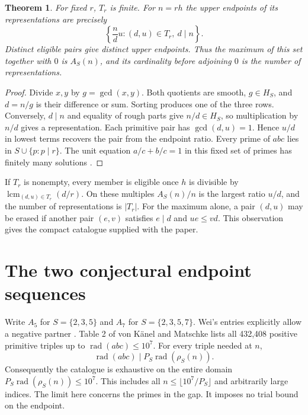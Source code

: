 \documentclass[11pt,letterpaper]{article}
\newtheorem{theorem}{Theorem}
\newcommand{\Hs}{H_S}
\newcommand{\rad}{\operatorname{rad}}
\newcommand{\rough}{\rho_S}
\newcommand{\lcm}{\operatorname{lcm}}
\begin{document}
\begin{theorem}\label{th:templates}
For fixed $r$, $T_r$ is finite. For $n=rh$ the upper endpoints of its representations are precisely
\[
 \left\{\frac{n}{d}u:(d,u)\in T_r,\ d\mid n\right\}.
\]
Distinct eligible pairs give distinct upper endpoints. Thus the maximum of this set together with $0$ is $A_S(n)$, and its cardinality before adjoining $0$ is the number of representations.
\end{theorem}
\begin{proof}
Divide $x,y$ by $g=\gcd(x,y)$. Both quotients are smooth, $g\in\Hs$, and $d=n/g$ is their difference or sum. Sorting produces one of the three rows. Conversely, $d\mid n$ and equality of rough parts give $n/d\in\Hs$, so multiplication by $n/d$ gives a representation. Each primitive pair has $\gcd(d,u)=1$. Hence $u/d$ in lowest terms recovers the pair from the endpoint ratio. Every prime of $abc$ lies in $S\cup\{p:p\mid r\}$. The unit equation $a/c+b/c=1$ in this fixed set of primes has finitely many solutions \cite{ess,vkm}.
\end{proof}

If $T_r$ is nonempty, every member is eligible once $h$ is divisible by $\lcm_{(d,u)\in T_r}(d/r)$. On these multiples $A_S(n)/n$ is the largest ratio $u/d$, and the number of representations is $|T_r|$. For the maximum alone, a pair $(d,u)$ may be erased if another pair $(e,v)$ satisfies $e\mid d$ and $u e\le v d$. This observation gives the compact catalogue supplied with the paper.

\section{The two conjectural endpoint sequences}
Write $A_5$ for $S=\{2,3,5\}$ and $A_7$ for $S=\{2,3,5,7\}$. Wei's entries explicitly allow a negative partner \cite{oeis}. Table 2 of von K\"anel and Matschke \cite{data} lists all 432,408 positive primitive triples up to $\rad(abc)\le10^7$. For every triple needed at $n$,
\[
 \rad(abc)\mid P_S\rad(\rough(n)).
\]
Consequently the catalogue is exhaustive on the entire domain
$P_S\rad(\rough(n))\le10^7$. This includes all $n\le\lfloor10^7/P_S\rfloor$ and arbitrarily large indices. The limit here concerns the primes in the gap. It imposes no trial bound on the endpoint.
\end{document}
